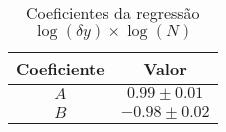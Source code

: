 \begin{table}[H]
	\centering
	\begin{tabular}{cc}
		\toprule\toprule
            {\bfseries Coeficiente} & {\bfseries Valor}
        \\\midrule
            $A$ & $0.99 \pm 0.01$ \\
            $B$ & $-0.98 \pm 0.02$
        \\\bottomrule\bottomrule
	\end{tabular}

	\caption{Coeficientes da regressão $\log(\delta y)\times\log(N)$}
	\label{tab:regres}
\end{table}